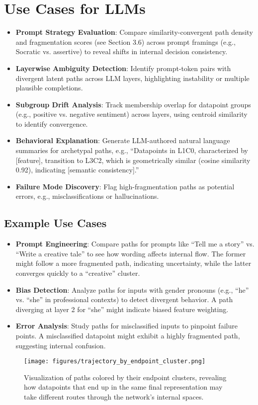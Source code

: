 \section{Use Cases for LLMs}

\begin{itemize}
    \item \textbf{Prompt Strategy Evaluation}: Compare similarity-convergent path density and fragmentation scores (see Section 3.6) across prompt framings (e.g., Socratic vs. assertive) to reveal shifts in internal decision consistency.
    \item \textbf{Layerwise Ambiguity Detection}: Identify prompt-token pairs with divergent latent paths across LLM layers, highlighting instability or multiple plausible completions.
    \item \textbf{Subgroup Drift Analysis}: Track membership overlap for datapoint groups (e.g., positive vs. negative sentiment) across layers, using centroid similarity to identify convergence.
    \item \textbf{Behavioral Explanation}: Generate LLM-authored natural language summaries for archetypal paths, e.g., ``Datapoints in L1C0, characterized by [feature], transition to L3C2, which is geometrically similar (cosine similarity 0.92), indicating [semantic consistency].''
    \item \textbf{Failure Mode Discovery}: Flag high-fragmentation paths as potential errors, e.g., misclassifications or hallucinations.
\end{itemize}

\subsection{Example Use Cases}

\begin{itemize}
    \item \textbf{Prompt Engineering}: Compare paths for prompts like ``Tell me a story'' vs. ``Write a creative tale'' to see how wording affects internal flow. The former might follow a more fragmented path, indicating uncertainty, while the latter converges quickly to a ``creative'' cluster.
    \item \textbf{Bias Detection}: Analyze paths for inputs with gender pronouns (e.g., ``he'' vs. ``she'' in professional contexts) to detect divergent behavior. A path diverging at layer 2 for ``she'' might indicate biased feature weighting.
    \item \textbf{Error Analysis}: Study paths for misclassified inputs to pinpoint failure points. A misclassified datapoint might exhibit a highly fragmented path, suggesting internal confusion.
\end{itemize}

\begin{figure}[ht]
    \centering
    \texttt{[image: figures/trajectory\_by\_endpoint\_cluster.png]}
    \caption{Visualization of paths colored by their endpoint clusters, revealing how datapoints that end up in the same final representation may take different routes through the network's internal spaces.}
    \label{fig:trajectory_endpoint}
\end{figure}
